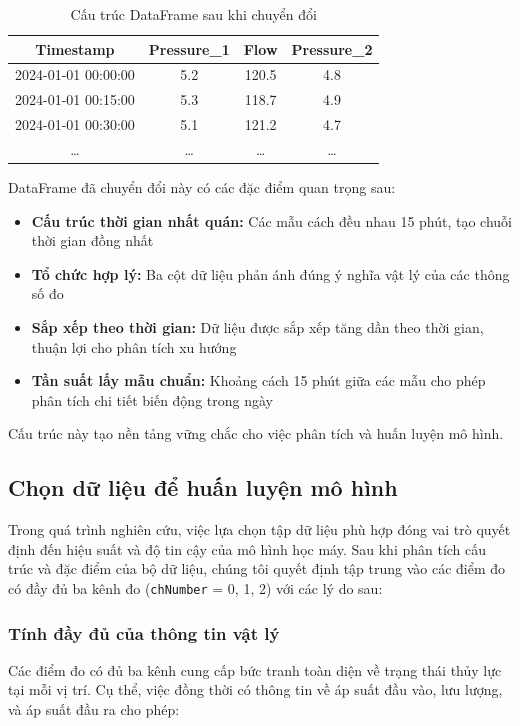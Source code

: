 \begin{table}[htbp]
    \centering
    \begin{tabular}{|c|c|c|c|}
        \hline
        \textbf{Timestamp} & \textbf{Pressure\_1} & \textbf{Flow} & \textbf{Pressure\_2} \\
        \hline
        2024-01-01 00:00:00 & 5.2 & 120.5 & 4.8 \\
        2024-01-01 00:15:00 & 5.3 & 118.7 & 4.9 \\
        2024-01-01 00:30:00 & 5.1 & 121.2 & 4.7 \\
        \ldots & \ldots & \ldots & \ldots \\
        \hline
    \end{tabular}
    \caption{Cấu trúc DataFrame sau khi chuyển đổi}
    \label{tab:transformed_data_structure}
\end{table}

DataFrame đã chuyển đổi này có các đặc điểm quan trọng sau:

\begin{itemize}
    \item \textbf{Cấu trúc thời gian nhất quán:} Các mẫu cách đều nhau 15 phút, tạo chuỗi thời gian đồng nhất
    \item \textbf{Tổ chức hợp lý:} Ba cột dữ liệu phản ánh đúng ý nghĩa vật lý của các thông số đo
    \item \textbf{Sắp xếp theo thời gian:} Dữ liệu được sắp xếp tăng dần theo thời gian, thuận lợi cho phân tích xu hướng
    \item \textbf{Tần suất lấy mẫu chuẩn:} Khoảng cách 15 phút giữa các mẫu cho phép phân tích chi tiết biến động trong ngày
\end{itemize}

Cấu trúc này tạo nền tảng vững chắc cho việc phân tích và huấn luyện mô hình.

\subsection{Chọn dữ liệu để huấn luyện mô hình}
Trong quá trình nghiên cứu, việc lựa chọn tập dữ liệu phù hợp đóng vai trò quyết định đến hiệu suất và độ tin cậy của mô hình học máy. Sau khi phân tích cấu trúc và đặc điểm của bộ dữ liệu, chúng tôi quyết định tập trung vào các điểm đo có đầy đủ ba kênh đo (\texttt{chNumber} = 0, 1, 2) với các lý do sau:

\subsubsection{Tính đầy đủ của thông tin vật lý}
Các điểm đo có đủ ba kênh cung cấp bức tranh toàn diện về trạng thái thủy lực tại mỗi vị trí. Cụ thể, việc đồng thời có thông tin về áp suất đầu vào, lưu lượng, và áp suất đầu ra cho phép:

